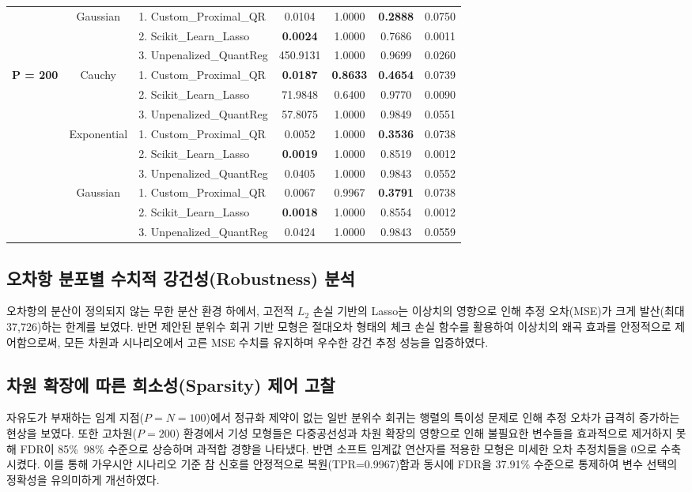 \documentclass[10pt,a4paper]{article}
\begin{document}
\begin{center}
\begin{tabular}{cclcccc}
\cmidrule{2-7}
& \multirow{3}{*}{Gaussian} & 1. Custom\_Proximal\_QR & 0.0104 & 1.0000 & \textbf{0.2888} & 0.0750 \\
& & 2. Scikit\_Learn\_Lasso & \textbf{0.0024} & 1.0000 & 0.7686 & 0.0011 \\
& & 3. Unpenalized\_QuantReg & 450.9131 & 1.0000 & 0.9699 & 0.0260 \\
\midrule
\multirow{9}{*}{\textbf{P = 200}} 
& \multirow{3}{*}{Cauchy} & 1. Custom\_Proximal\_QR & \textbf{0.0187} & \textbf{0.8633} & \textbf{0.4654} & 0.0739 \\
& & 2. Scikit\_Learn\_Lasso & 71.9848 & 0.6400 & 0.9770 & 0.0090 \\
& & 3. Unpenalized\_QuantReg & 57.8075 & 1.0000 & 0.9849 & 0.0551 \\
\cmidrule{2-7}
& \multirow{3}{*}{Exponential} & 1. Custom\_Proximal\_QR & 0.0052 & 1.0000 & \textbf{0.3536} & 0.0738 \\
& & 2. Scikit\_Learn\_Lasso & \textbf{0.0019} & 1.0000 & 0.8519 & 0.0012 \\
& & 3. Unpenalized\_QuantReg & 0.0405 & 1.0000 & 0.9843 & 0.0552 \\
\cmidrule{2-7}
& \multirow{3}{*}{Gaussian} & 1. Custom\_Proximal\_QR & 0.0067 & 0.9967 & \textbf{0.3791} & 0.0738 \\
& & 2. Scikit\_Learn\_Lasso & \textbf{0.0018} & 1.0000 & 0.8554 & 0.0012 \\
& & 3. Unpenalized\_QuantReg & 0.0424 & 1.0000 & 0.9843 & 0.0559 \\
\bottomrule
\end{tabular}
\end{center}

\subsection{오차항 분포별 수치적 강건성(Robustness) 분석}
오차항의 분산이 정의되지 않는 무한 분산 환경 하에서, 고전적 $L_2$ 손실 기반의 Lasso는 이상치의 영향으로 인해 추정 오차(MSE)가 크게 발산(최대 37,726)하는 한계를 보였다. 반면 제안된 분위수 회귀 기반 모형은 절대오차 형태의 체크 손실 함수를 활용하여 이상치의 왜곡 효과를 안정적으로 제어함으로써, 모든 차원과 시나리오에서 고른 MSE 수치를 유지하며 우수한 강건 추정 성능을 입증하였다.

\subsection{차원 확장에 따른 희소성(Sparsity) 제어 고찰}
자유도가 부재하는 임계 지점($P=N=100$)에서 정규화 제약이 없는 일반 분위수 회귀는 행렬의 특이성 문제로 인해 추정 오차가 급격히 증가하는 현상을 보였다. 또한 고차원($P=200$) 환경에서 기성 모형들은 다중공선성과 차원 확장의 영향으로 인해 불필요한 변수들을 효과적으로 제거하지 못해 FDR이 85\%~98\% 수준으로 상승하며 과적합 경향을 나타냈다. 반면 소프트 임계값 연산자를 적용한 모형은 미세한 오차 추정치들을 0으로 수축시켰다. 이를 통해 가우시안 시나리오 기준 참 신호를 안정적으로 복원(TPR=0.9967)함과 동시에 FDR을 37.91\% 수준으로 통제하여 변수 선택의 정확성을 유의미하게 개선하였다.
\end{document}
